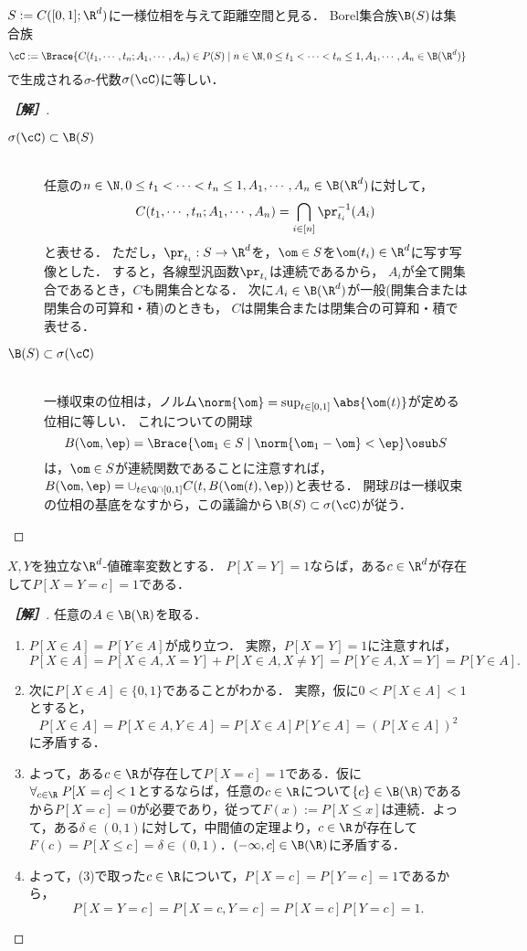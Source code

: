\documentclass[uplatex,dvipdfmx]{jsarticle}
\begin{document}
\begin{problem*}[10]
    $S:=C([0,1];\R^d)$に一様位相を与えて距離空間と見る．
    Borel集合族$\B(S)$は集合族
    \[\cC:=\Brace{C(t_1,\cdots,t_n;A_1,\cdots,A_n)\in P(S)\mid n\in\N,0\le t_1<\cdots<t_n\le1,A_1,\cdots,A_n\in\B(\R^d)}\]
    で生成される$\sigma$-代数$\sigma(\cC)$に等しい．
\end{problem*}
\begin{proof}[\bf［解］]\mbox{}
    \begin{description}
        \item[$\sigma(\cC)\subset\B(S)$] \mbox{}\\任意の$n\in\N,0\le t_1<\cdots<t_n\le1,A_1,\cdots,A_n\in\B(\R^d)$に対して，
        \[C(t_1,\cdots,t_n; A_1,\cdots,A_n)=\bigcap_{i\in[n]}\pr_{t_i}^{-1}(A_i)\]
        と表せる．
        ただし，$\pr_{t_i}:S\to\R^d$を，$\om\in S$を$\om(t_i)\in\R^d$に写す写像とした．
        すると，各線型汎函数$\pr_{t_i}$は連続であるから，
        $A_i$が全て開集合であるとき，$C$も開集合となる．
        次に$A_i\in\B(\R^d)$が一般(開集合または閉集合の可算和・積)のときも，
        $C$は開集合または閉集合の可算和・積で表せる．
        \item[$\B(S)\subset\sigma(\cC)$] \mbox{}\\一様収束の位相は，ノルム$\norm{\om}=\sup_{t\in[0,1]}\abs{\om(t)}$が定める位相に等しい．
        これについての開球
        \[B(\om,\ep)=\Brace{\om_1\in S\mid\norm{\om_1-\om}<\ep}\osub S\]
        は，$\om\in S$が連続関数であることに注意すれば，
        $B(\om,\ep)=\cup_{t\in\Q\cap[0,1]}C(t,B(\om(t),\ep))$と表せる．
        開球$B$は一様収束の位相の基底をなすから，この議論から$\B(S)\subset\sigma(\cC)$が従う．
    \end{description}
\end{proof}

\begin{problem*}[13]
    $X,Y$を独立な$\R^d$-値確率変数とする．
    $P[X=Y]=1$ならば，ある$c\in\R^d$が存在して$P[X=Y=c]=1$である．
\end{problem*}
\begin{proof}[\bf［解］]
    任意の$A\in\B(\R)$を取る．
    \begin{enumerate}
        \item $P[X\in A]=P[Y\in A]$が成り立つ．
        実際，$P[X=Y]=1$に注意すれば，
        \[P[X\in A]=P[X\in A,X=Y]+P[X\in A,X\ne Y]=P[Y\in A,X=Y]=P[Y\in A].\]
        \item 次に$P[X\in A]\in\{0,1\}$であることがわかる．
        実際，仮に$0<P[X\in A]<1$とすると，
        \[P[X\in A]=P[X\in A,Y\in A]=P[X\in A]P[Y\in A]=(P[X\in A])^2\]
        に矛盾する．
        \item よって，ある$c\in\R$が存在して$P[X=c]=1$である．仮に$\forall_{c\in\R}\;P[X=c]<1$とするならば，任意の$c\in\R$について$\{c\}\in\B(\R)$であるから$P[X=c]=0$が必要であり，従って$F(x):=P[X\le x]$は連続．よって，ある$\delta\in(0,1)$に対して，中間値の定理より，$c\in\R$が存在して$F(c)=P[X\le c]=\delta\in(0,1)$．$(-\infty,c]\in\B(\R)$に矛盾する．
        \item よって，(3)で取った$c\in\R$について，$P[X=c]=P[Y=c]=1$であるから，
        \[P[X=Y=c]=P[X=c,Y=c]=P[X=c]P[Y=c]=1.\]
    \end{enumerate}
\end{proof}
\end{document}
